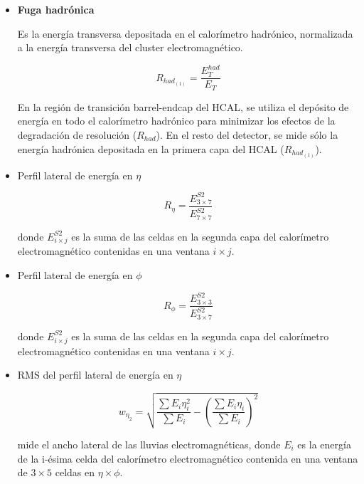 \begin{itemize}

	\item \textbf{Fuga hadrónica}

		Es la energía transversa depositada en el calorímetro hadrónico, normalizada a la energía transversa del cluster electromagnético.

		\begin{equation}
		R_{had_{(1)}}=\frac{E_{T}^{had}}{E_{T}}
		\end{equation}

		En la región de transición barrel-endcap del HCAL, se utiliza el depósito de energía en todo el calorímetro hadrónico para minimizar los efectos de la degradación de resolución ($R_{had}$). En el resto del detector, se mide sólo la energía hadrónica depositada en la primera capa del HCAL ($R_{had_{(1)}}$).

	\item  Perfil lateral de energía en $\eta$

		\begin{equation}
		R_{\eta}=\frac{E_{3\times 7}^{S2}}{E_{7\times 7}^{S2}}
		\end{equation}

 		donde $E_{i\times j}^{S2}$ es la suma de las celdas en la segunda capa del calorímetro electromagnético contenidas en una ventana $i\times j$.

	\item  Perfil lateral de energía en $\phi$

		\begin{equation}
		R_{\phi}=\frac{E_{3\times 3}^{S2}}{E_{3\times 7}^{S2}}
		\end{equation}

 		donde $E_{i\times j}^{S2}$ es la suma de las celdas en la segunda capa del calorímetro electromagnético contenidas en una ventana $i\times j$.

	\item  RMS del perfil lateral de energía en $\eta$


		\begin{equation}
		w_{\eta_{2}}=\sqrt{\frac{\sum E_{i}\eta_{i}^{2}}{\sum E_{i}}- \left(\frac{\sum E_{i}\eta_{i}}{\sum E_{i}}\right)^{2}}
		\end{equation}

		mide el ancho lateral de las lluvias electromagnéticas, donde $E_{i}$ es la energía de la i-ésima celda del calorímetro electromagnético contenida en una ventana de $3\times 5$ celdas en $\eta \times \phi$.


\end{itemize}
